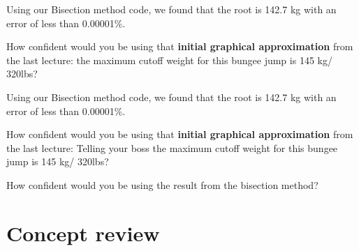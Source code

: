 \documentclass{if-beamer}
\begin{document}
\begin{frame}
Using our Bisection method code, we found that the root is 142.7 kg with an error of less than 0.00001\%. \\\vspace{7pt}

How confident would you be using that \textbf{initial graphical approximation} from the last lecture: the maximum cutoff weight for this bungee jump is 145 kg/ 320lbs?
\end{frame}

\begin{frame}
Using our Bisection method code, we found that the root is 142.7 kg with an error of less than 0.00001\%. \\\vspace{7pt}

How confident would you be using that \textbf{initial graphical approximation} from the last lecture: Telling your boss the maximum cutoff weight for this bungee jump is 145 kg/ 320lbs?\\\vspace{7pt}

How confident would you be using the result from the bisection method?
\end{frame}



\section{Concept review}
\end{document}
